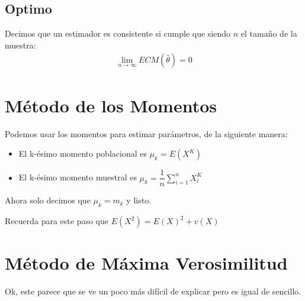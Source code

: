 \documentclass[12pt, fleqn]{report}                             %
\theoremstyle{break}                                            %
\begin{document}
            \subsection{Optimo}

                Decimos que un estimador es consistente si cumple que siendo
                $n$ el tamaño de la muestra:
                \begin{align*}
                    \lim_{n \to \infty} ECM(\hat \theta) = 0 
                \end{align*}



        \clearpage
        \section{Método de los Momentos}  

            Podemos usar los momentos para estimar parámetros, de la siguiente manera:
            \begin{itemize}
                \item El k-ésimo momento poblacional es $\mu_k = E(X^K)$
                \item El k-ésimo momento muestral es 
                    $\mu_k = \dfrac{1}{n} \sum_{i=1}^n X_i^K$
            \end{itemize}

            Ahora solo decimos que $\mu_k = m_k$ y listo.


            Recuerda para este paso que $E(X^2) = E(X)^2 + v(X)$



        \vspace{1em}
        \section{Método de Máxima Verosimilitud}

            Ok, este parece que se ve un poco más difícil de explicar pero
            es igual de sencillo.
\end{document}
